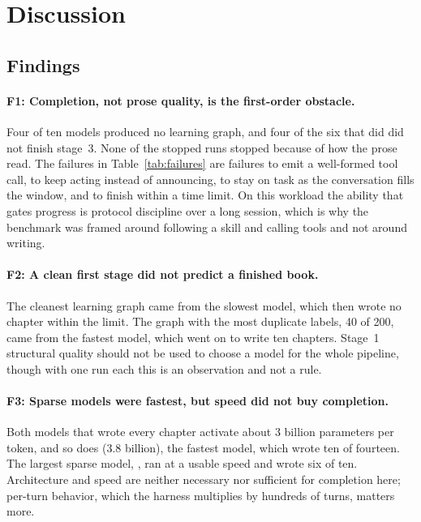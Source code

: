 \section{Discussion}
\label{sec:discussion}

\subsection{Findings}

\paragraph{F1: Completion, not prose quality, is the first-order obstacle.}
Four of ten models produced no learning graph, and four of the six that did did not finish stage~3. None of the stopped runs stopped because of how the prose read. The failures in Table~\ref{tab:failures} are failures to emit a well-formed tool call, to keep acting instead of announcing, to stay on task as the conversation fills the window, and to finish within a time limit. On this workload the ability that gates progress is protocol discipline over a long session, which is why the benchmark was framed around following a skill and calling tools and not around writing.

\paragraph{F2: A clean first stage did not predict a finished book.}
The cleanest learning graph came from the slowest model, which then wrote no chapter within the limit. The graph with the most duplicate labels, 40 of 200, came from the fastest model, which went on to write ten chapters. Stage~1 structural quality should not be used to choose a model for the whole pipeline, though with one run each this is an observation and not a rule.

\paragraph{F3: Sparse models were fastest, but speed did not buy completion.}
Both models that wrote every chapter activate about 3 billion parameters per token, and so does \Gtwentysix{} (3.8 billion), the fastest model, which wrote ten of fourteen. The largest sparse model, \Gptoss, ran at a usable speed and wrote six of ten. Architecture and speed are neither necessary nor sufficient for completion here; per-turn behavior, which the harness multiplies by hundreds of turns, matters more.

